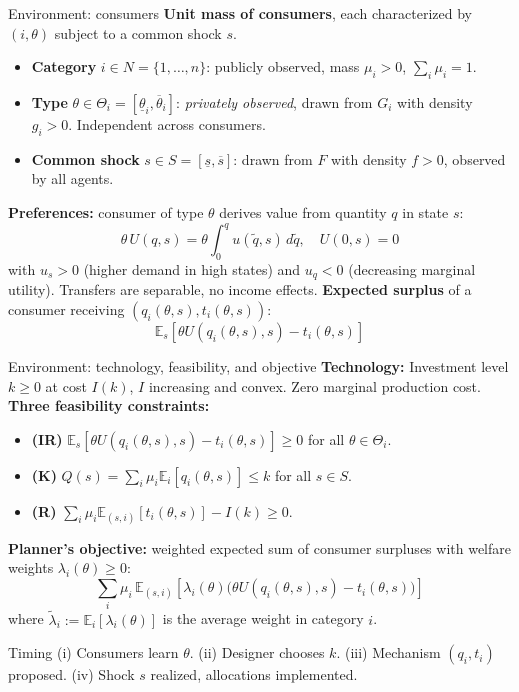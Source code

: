 \documentclass[10pt, aspectratio=169]{beamer}
\newcommand{\E}{\mathbb{E}}
\begin{document}
\begin{frame}{Environment: consumers}
\textbf{Unit mass of consumers}, each characterized by $(i, \theta)$ subject to a common shock $s$.
\vspace{0.2cm}
\begin{itemize}
\item \textbf{Category} $i \in N = \{1,\dots,n\}$: publicly observed, mass $\mu_i > 0$, $\sum_i \mu_i = 1$.
\item \textbf{Type} $\theta \in \Theta_i = [\underline{\theta}_i, \overline{\theta}_i]$: \emph{privately observed}, drawn from $G_i$ with density $g_i > 0$. Independent across consumers.
\item \textbf{Common shock} $s \in S = [\underline{s}, \overline{s}]$: drawn from $F$ with density $f > 0$, observed by all agents.
\end{itemize}
\vspace{0.3cm}
\textbf{Preferences:} consumer of type $\theta$ derives value from quantity $q$ in state $s$:
\[ \theta\, U(q,s) = \theta \int_0^q u(\tilde{q}, s)\, d\tilde{q}, \quad U(0,s)=0 \]
with $u_s > 0$ (higher demand in high states) and $u_q < 0$ (decreasing marginal utility). Transfers are separable, no income effects.
\vspace{0.2cm}
\textbf{Expected surplus} of a consumer receiving $(q_i(\theta,s), t_i(\theta,s))$:
\[ \E_s\!\left[\theta U(q_i(\theta,s),s) - t_i(\theta,s)\right] \]
\end{frame}

\begin{frame}{Environment: technology, feasibility, and objective}
\textbf{Technology:} Investment level $k \geq 0$ at cost $I(k)$, $I$ increasing and convex. Zero marginal production cost.
\vspace{0.2cm}
\textbf{Three feasibility constraints:}
\begin{itemize}
\item \textbf{(IR)} $\E_s\!\left[\theta U(q_i(\theta,s),s) - t_i(\theta,s)\right] \geq 0$ for all $\theta \in \Theta_i$.
\item \textbf{(K)} $Q(s) = \sum_i \mu_i \E_i[q_i(\theta,s)] \leq k$ for all $s \in S$.
\item \textbf{(R)} $\sum_i \mu_i \E_{(s,i)}[t_i(\theta,s)] - I(k) \geq 0$.
\end{itemize}
\vspace{0.3cm}
\textbf{Planner's objective:} weighted expected sum of consumer surpluses with welfare weights $\lambda_i(\theta) \geq 0$:
\[ \sum_i \mu_i\, \E_{(s,i)}\!\left[\lambda_i(\theta)\bigl(\theta U(q_i(\theta,s),s) - t_i(\theta,s)\bigr)\right] \]
where $\tilde{\lambda}_i := \E_i[\lambda_i(\theta)]$ is the average weight in category $i$.
\vspace{0.2cm}
\begin{block}{Timing}
(i) Consumers learn $\theta$. (ii) Designer chooses $k$. (iii) Mechanism $(q_i, t_i)$ proposed. (iv) Shock $s$ realized, allocations implemented.
\end{block}
\end{frame}
\end{document}

